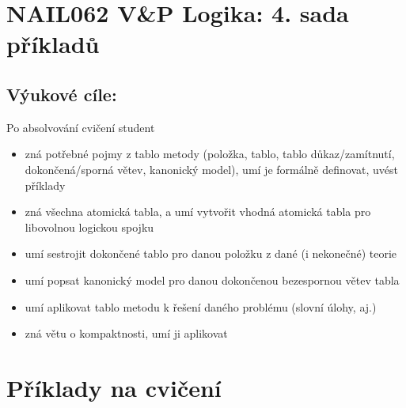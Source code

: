 \documentclass[a4paper,11pt]{amsart}
\begin{document}
\section*{NAIL062 V\&P Logika: 4. sada příkladů}



\subsection*{Výukové cíle:} Po absolvování cvičení student

    \begin{itemize}\setlength{\itemsep}{0pt}
        \item zná potřebné pojmy z tablo metody (položka, tablo, tablo důkaz/zamítnutí, dokončená/sporná větev, kanonický model), umí je formálně definovat, uvést příklady
        \item zná všechna atomická tabla, a umí vytvořit vhodná atomická tabla pro libovolnou logickou spojku
        \item umí sestrojit dokončené tablo pro danou položku z dané (i nekonečné) teorie
        \item umí popsat kanonický model pro danou dokončenou bezespornou větev tabla
        \item umí aplikovat tablo metodu k řešení daného problému (slovní úlohy, aj.)
        \item zná větu o kompaktnosti, umí ji aplikovat
    \end{itemize}
    

\section*{Příklady na cvičení}
\end{document}
